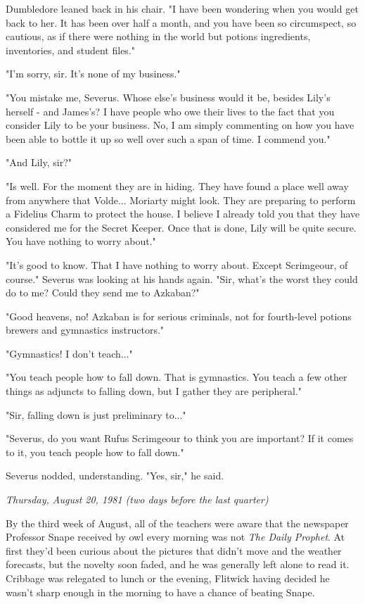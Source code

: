 \documentclass[a4paper,11pt]{article}
\begin{document}
Dumbledore leaned back in his chair. "I have been wondering when you would get back to her. It has been over half a month, and you have been so circumspect, so cautious, as if there were nothing in the world but potions ingredients, inventories, and student files."

"I'm sorry, sir. It's none of my business."

"You mistake me, Severus. Whose else's business would it be, besides Lily's herself - and James's? I have people who owe their lives to the fact that you consider Lily to be your business. No, I am simply commenting on how you have been able to bottle it up so well over such a span of time. I commend you."

"And Lily, sir?"

"Is well. For the moment they are in hiding. They have found a place well away from anywhere that Volde... Moriarty might look. They are preparing to perform a Fidelius Charm to protect the house. I believe I already told you that they have considered me for the Secret Keeper. Once that is done, Lily will be quite secure. You have nothing to worry about."

"It's good to know. That I have nothing to worry about. Except Scrimgeour, of course." Severus was looking at his hands again. "Sir, what's the worst they could do to me? Could they send me to Azkaban?"

"Good heavens, no! Azkaban is for serious criminals, not for fourth-level potions brewers and gymnastics instructors."

"Gymnastics! I don't teach..."

"You teach people how to fall down. That is gymnastics. You teach a few other things as adjuncts to falling down, but I gather they are peripheral."

"Sir, falling down is just preliminary to..."

"Severus, do you want Rufus Scrimgeour to think you are important? If it comes to it, you teach people how to fall down."

Severus nodded, understanding. "Yes, sir," he said.

\emph{Thursday, August 20, 1981 (two days before the last quarter)}

By the third week of August, all of the teachers were aware that the newspaper Professor Snape received by owl every morning was not \emph{The Daily Prophet}. At first they'd been curious about the pictures that didn't move and the weather forecasts, but the novelty soon faded, and he was generally left alone to read it. Cribbage was relegated to lunch or the evening, Flitwick having decided he wasn't sharp enough in the morning to have a chance of beating Snape.
\end{document}
